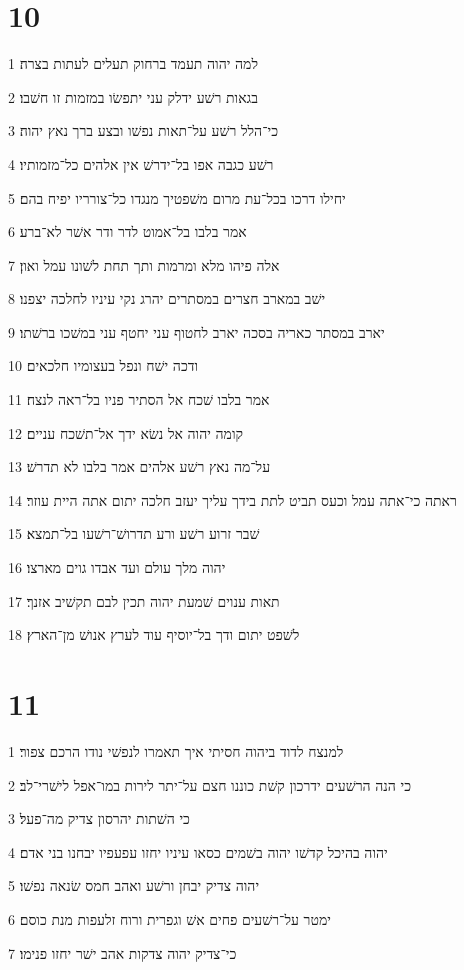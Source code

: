 \chapter{10}

\par 1 למה יהוה תעמד ברחוק תעלים לעתות בצרה׃
\par 2 בגאות רשׁע ידלק עני יתפשׂו במזמות זו חשׁבו׃
\par 3 כי־הלל רשׁע על־תאות נפשׁו ובצע ברך נאץ יהוה׃
\par 4 רשׁע כגבה אפו בל־ידרשׁ אין אלהים כל־מזמותיו׃
\par 5 יחילו דרכו בכל־עת מרום משׁפטיך מנגדו כל־צורריו יפיח בהם׃
\par 6 אמר בלבו בל־אמוט לדר ודר אשׁר לא־ברע׃
\par 7 אלה פיהו מלא ומרמות ותך תחת לשׁונו עמל ואון׃
\par 8 ישׁב במארב חצרים במסתרים יהרג נקי עיניו לחלכה יצפנו׃
\par 9 יארב במסתר כאריה בסכה יארב לחטוף עני יחטף עני במשׁכו ברשׁתו׃
\par 10 ודכה ישׁח ונפל בעצומיו חלכאים׃
\par 11 אמר בלבו שׁכח אל הסתיר פניו בל־ראה לנצח׃
\par 12 קומה יהוה אל נשׂא ידך אל־תשׁכח עניים׃
\par 13 על־מה נאץ רשׁע אלהים אמר בלבו לא תדרשׁ׃
\par 14 ראתה כי־אתה עמל וכעס תביט לתת בידך עליך יעזב חלכה יתום אתה היית עוזר׃
\par 15 שׁבר זרוע רשׁע ורע תדרושׁ־רשׁעו בל־תמצא׃
\par 16 יהוה מלך עולם ועד אבדו גוים מארצו׃
\par 17 תאות ענוים שׁמעת יהוה תכין לבם תקשׁיב אזנך׃
\par 18 לשׁפט יתום ודך בל־יוסיף עוד לערץ אנושׁ מן־הארץ׃

\chapter{11}

\par 1 למנצח לדוד ביהוה חסיתי איך תאמרו לנפשׁי נודו הרכם צפור׃
\par 2 כי הנה הרשׁעים ידרכון קשׁת כוננו חצם על־יתר לירות במו־אפל לישׁרי־לב׃
\par 3 כי השׁתות יהרסון צדיק מה־פעל׃
\par 4 יהוה בהיכל קדשׁו יהוה בשׁמים כסאו עיניו יחזו עפעפיו יבחנו בני אדם׃
\par 5 יהוה צדיק יבחן ורשׁע ואהב חמס שׂנאה נפשׁו׃
\par 6 ימטר על־רשׁעים פחים אשׁ וגפרית ורוח זלעפות מנת כוסם׃
\par 7 כי־צדיק יהוה צדקות אהב ישׁר יחזו פנימו׃

